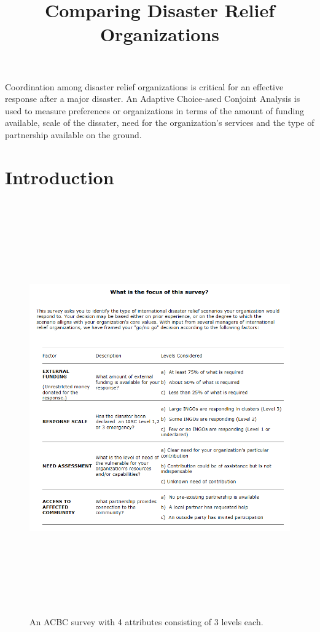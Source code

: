 \documentclass{SBCbookchapter}
\title{Comparing Disaster Relief Organizations}
\author{}
\begin{document}
\maketitle

\vspace{.3in}
\begin{minipage}[r]{4.25in}{\small
Coordination among disaster relief organizations is critical for an effective response after a major disaster. An Adaptive Choice-ased Conjoint Analysis is used to measure preferences or organizations in terms of the amount of funding available,  scale of the dissater, need for the organization's services and the type of partnership available on the ground.}
\end{minipage}

\newpage

\section{Introduction}

\begin{figure}[!htpb]
\centering
\includegraphics[width=5.75in, height=7in]{AttributeLevels.png}
\caption{{\small An ACBC survey with 4 attributes consisting of 3 levels each. }}
\label{AL}
\end{figure}
\end{document}
